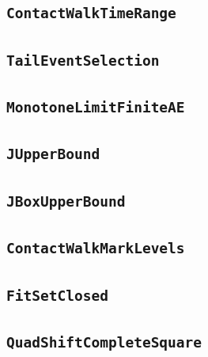 \documentclass[11pt]{amsart}
\theoremstyle{definition}
\begin{document}
\subsection{\texorpdfstring{\texttt{ContactWalkTimeRange}}{ContactWalkTimeRange}}\label{node:ContactWalkTimeRange}


\subsection{\texorpdfstring{\texttt{TailEventSelection}}{TailEventSelection}}\label{node:TailEventSelection}


\subsection{\texorpdfstring{\texttt{MonotoneLimitFiniteAE}}{MonotoneLimitFiniteAE}}\label{node:MonotoneLimitFiniteAE}


\subsection{\texorpdfstring{\texttt{JUpperBound}}{JUpperBound}}\label{node:JUpperBound}


\subsection{\texorpdfstring{\texttt{JBoxUpperBound}}{JBoxUpperBound}}\label{node:JBoxUpperBound}


\subsection{\texorpdfstring{\texttt{ContactWalkMarkLevels}}{ContactWalkMarkLevels}}\label{node:ContactWalkMarkLevels}


\subsection{\texorpdfstring{\texttt{FitSetClosed}}{FitSetClosed}}\label{node:FitSetClosed}


\subsection{\texorpdfstring{\texttt{QuadShiftCompleteSquare}}{QuadShiftCompleteSquare}}\label{node:QuadShiftCompleteSquare}

\end{document}
